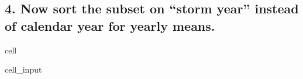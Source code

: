 \documentclass[letterpaper,10pt,english]{jupyterBook}
\begin{document}
\subsection{4. Now sort the subset on “storm year” instead of calendar year for yearly means.}
\label{\detokenize{notebooks/regional_and_local/SL_anomaly_annual:now-sort-the-subset-on-storm-year-instead-of-calendar-year-for-yearly-means}}
\begin{sphinxuseclass}{cell}\begin{sphinxVerbatimInput}

\begin{sphinxuseclass}{cell_input}
\begin{sphinxVerbatim}[commandchars=\\\{\}]
  

  

\end{sphinxVerbatim}

\end{sphinxuseclass}\end{sphinxVerbatimInput}
\begin{sphinxVerbatimOutput}


\end{sphinxVerbatimOutput}
\end{sphinxuseclass}
\end{document}

